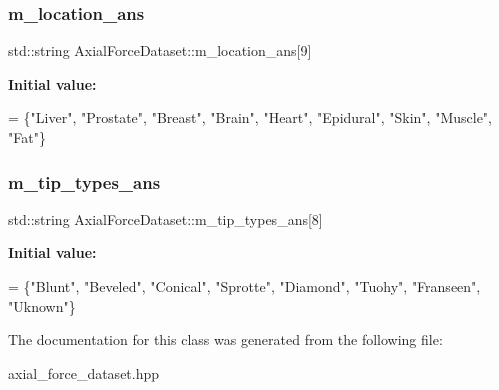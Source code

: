 \subsubsection{\texorpdfstring{m\+\_\+location\+\_\+ans}{m\_location\_ans}}
{\footnotesize\ttfamily std\+::string Axial\+Force\+Dataset\+::m\+\_\+location\+\_\+ans\mbox{[}9\mbox{]}\hspace{0.3cm}{\ttfamily [protected]}}

{\bfseries Initial value\+:}
\begin{DoxyCode}
= \{\textcolor{stringliteral}{"Liver"}, \textcolor{stringliteral}{"Prostate"}, \textcolor{stringliteral}{"Breast"}, \textcolor{stringliteral}{"Brain"}, 
        \textcolor{stringliteral}{"Heart"}, \textcolor{stringliteral}{"Epidural"}, \textcolor{stringliteral}{"Skin"}, \textcolor{stringliteral}{"Muscle"}, \textcolor{stringliteral}{"Fat"}\}
\end{DoxyCode}
\mbox{\label{classAxialForceDataset_ab7a88a4d578280d870cfa4648b3fc3ea}} 
\subsubsection{\texorpdfstring{m\+\_\+tip\+\_\+types\+\_\+ans}{m\_tip\_types\_ans}}
{\footnotesize\ttfamily std\+::string Axial\+Force\+Dataset\+::m\+\_\+tip\+\_\+types\+\_\+ans\mbox{[}8\mbox{]}\hspace{0.3cm}{\ttfamily [protected]}}

{\bfseries Initial value\+:}
\begin{DoxyCode}
= \{\textcolor{stringliteral}{"Blunt"}, \textcolor{stringliteral}{"Beveled"}, \textcolor{stringliteral}{"Conical"}, 
        \textcolor{stringliteral}{"Sprotte"}, \textcolor{stringliteral}{"Diamond"}, \textcolor{stringliteral}{"Tuohy"}, \textcolor{stringliteral}{"Franseen"}, \textcolor{stringliteral}{"Uknown"}\}
\end{DoxyCode}


The documentation for this class was generated from the following file\+:\begin{DoxyCompactItemize}
\item 
axial\+\_\+force\+\_\+dataset.\+hpp\end{DoxyCompactItemize}
